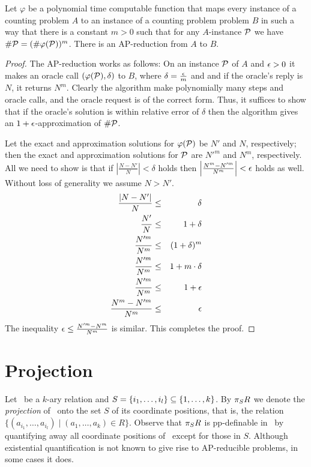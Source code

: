 \begin{lemma}\label{lem:logarithm}
Let \(\varphi\) be a polynomial time computable function that maps every instance of a
counting problem \(A\) to an instance of a counting problem problem \(B\) in such a way that
there is a constant \(m>0\) such that
for any \(A\)-instance \(\mathcal{P}\) we have
\(\#\mathcal{P} = (\#\varphi(\mathcal{P}))^m\)\@.
There is an AP-reduction from \(A\) to \(B\)\@.
\end{lemma}

\begin{proof}
The AP-reduction works as follows: On an instance \(\mathcal{P}\) of \(A\) and \(\epsilon > 0\) it makes 
an oracle call \((\varphi(\mathcal{P}),\delta)\) to \(B\), where \(\delta = \frac{\epsilon}{m}\) and 
and if the oracle's reply is \(N\), it returns \(N^m\)\@. Clearly the algorithm make polynomially 
many steps and oracle calls, and the oracle request is of the correct form.
Thus, it suffices to show that if the oracle's solution is within relative error of \(\delta\) then
the algorithm gives an \(1+\epsilon\)-approximation of \(\#\mathcal{P}\)\@.

Let the exact and approximation solutions for \(\varphi(\mathcal{P})\) be \(N'\) and \(N\), respectively;
then the exact and approximation solutions for \(\mathcal{P}\) are  
\(N'^m\) and \(N^m\), respectively.
All we need to show is that if \(\left|\frac{N-N'}{N}\right|<\delta\) holds then
\(\left|\frac{N^m-N'^m}{N^m}\right|<\epsilon\) holds as well. Without loss of generality we assume
\(N>N'\).
\begin{eqnarray*}
\frac{|N-N'|}{N} & \le & \delta \\
\frac{N'}{N} & \le & 1 + \delta \\
\frac{N'^m}{N^m} & \le & (1 + \delta) ^ m\\
\frac{N'^m}{N^m} & \le & 1 + m\cdot\delta \\
\frac{N'^m}{N^m} & \le & 1 + \epsilon \\
\frac{N^m - N'^m}{N^m} & \le & \epsilon
\end{eqnarray*}
The inequality \(\epsilon \le \frac{N'^m - N^m}{N^m}\) is similar.
This completes the proof.
\end{proof}

\section{Projection}
Let \mR\ be a \(k\)-ary relation and \(S=\{{i_1,\dotsc,i_l}\} \subseteq \{{1,\dotsc,k}\}\)\@.
By \(\pi_{S}{R}\) we denote the \emph{projection} of \mR\ onto the set \(S\) of its coordinate
positions, that is, the relation \(\{(a_{i_1},\dotsc,a_{i_l}) \mid (a_1,\dotsc,a_k)\in R\}\)\@.
Observe that \(\pi_{S}{R}\) is pp-definable in \mR\ by quantifying away all coordinate
positions of \mR\ except for those in \(S\)\@.
Although existential quantification is not known to give rise to AP-reducible problems, in some
cases it does.

